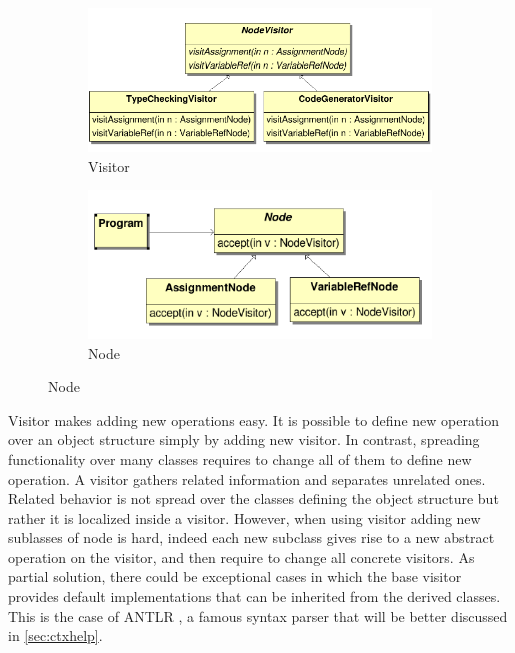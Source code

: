 \begin{figure}[h]
\centering
\begin{subfigure}{.48\textwidth}
\includegraphics[width=\textwidth]{Figs/visitor.PNG}
\caption{Visitor}
\label{fig:visitor}
\end{subfigure}
\begin{subfigure}{.48\textwidth}
\includegraphics[width=\textwidth]{Figs/nodeVisitor.PNG}
\caption{Node}
\label{fig:nodeVisitor}
\end{subfigure}
\end{figure}
Visitor makes adding new operations easy. It is possible to define new operation over an object structure simply by adding new visitor. In contrast, spreading functionality over many classes requires to change all of them to define new operation. A visitor gathers related information and separates unrelated ones. Related behavior is not spread over the classes defining the object structure but rather it is localized inside a visitor. However, when using visitor adding new sublasses of node is hard, indeed each new subclass gives rise to a new abstract operation on the visitor, and then require to change all concrete visitors. As partial solution, there could be exceptional cases in which the base visitor provides default implementations that can be inherited from the derived classes. This is the case of ANTLR \citep{antlr}, a famous syntax parser that will be better discussed in \ref{sec:ctxhelp}.
